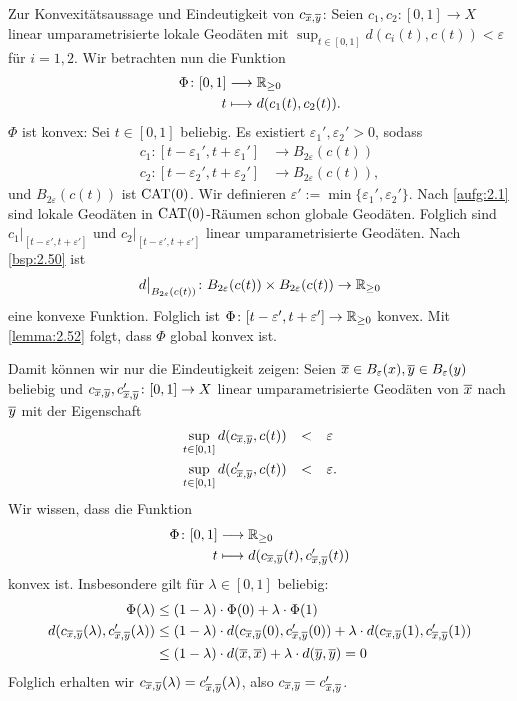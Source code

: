 \begin{beweis}
	Zur Konvexitätsaussage und Eindeutigkeit von $c_{\overline{x},\overline{y}}$:
	Seien $c_1,c_2 \colon [0,1] \rightarrow X$ linear umparametrisierte lokale Geodäten mit $\sup_{t \in [0,1]} d(c_i(t),c(t)) < \varepsilon$ für $i = 1,2$.
	Wir betrachten nun die Funktion
	\begin{align*}
		\Phi\colon [0,1] &\longrightarrow \mathbb{R}_{\geq 0} \\
		t &\longmapsto d(c_1(t),c_2(t)).
	\end{align*}
	$\Phi$ ist konvex:
	Sei $t \in [0,1]$ beliebig.
	Es existiert $\varepsilon_1', \varepsilon_2' > 0$, sodass
	\begin{align*}
		c_1 \colon [t- \varepsilon_1', t+ \varepsilon_1'] &\longrightarrow B_{2\varepsilon}(c(t)) \\
		c_2 \colon [t-\varepsilon_2', t+\varepsilon_2'] &\longrightarrow B_{2\varepsilon}(c(t)),
	\end{align*}
	und $B_{2\varepsilon}(c(t))$ ist $\operatorname{CAT(0)}$.
	Wir definieren $\varepsilon' := \min\{ \varepsilon_1',\varepsilon_2'\}$.
	Nach \autoref{aufg:2.1} sind lokale Geodäten in $\operatorname{CAT(0)}$-Räumen schon globale Geodäten.
	Folglich sind  $c_1 \big|_{[t-\varepsilon',t+\varepsilon']}$ und $c_2 \big|_{[t-\varepsilon',t+\varepsilon']}$ linear umparametrisierte Geodäten.
	Nach \autoref{bsp:2.50} ist
	\[
	d \big|_{B_{2\varepsilon}(c(t))} \colon B_{2\varepsilon}(c(t)) \times B_{2\varepsilon}(c(t)) \rightarrow \mathbb{R}_{\geq 0}
	\]
	eine konvexe Funktion. Folglich ist $\Phi \colon [t- \varepsilon',t+\varepsilon'] \rightarrow \mathbb{R}_{\geq 0}$ konvex.
	Mit \autoref{lemma:2.52} folgt, dass $\Phi$ global konvex ist.
	
	Damit können wir nur die Eindeutigkeit zeigen:
	Seien $\overline{x} \in B_\varepsilon(x), \overline{y} \in B_\varepsilon(y)$ beliebig und $c_{\overline{x},\overline{y}}, c_{\overline{x},\overline{y}}' \colon [0,1] \rightarrow X$ linear umparametrisierte Geodäten von $\overline{x}$ nach $\overline{y}$ mit der Eigenschaft
	\begin{align*}
		\sup_{t\in [0,1]} d(c_{\ol{x},\ol{y}}, c(t)) &\stack{}{<} \varepsilon \\
		\sup_{t \in [0,1]} d(c_{\ol{x},\ol{y}}',c(t)) &\stack{}{<} \varepsilon.
	\end{align*}
	Wir wissen, dass die Funktion
	\begin{align*}
		\Phi\colon [0,1] &\longrightarrow \mathbb{R}_{\geq 0} \\
		t &\longmapsto d(c_{\overline{x},\overline{y}}(t),c_{\overline{x},\overline{y}}'(t))
	\end{align*}
	konvex ist. \newpage
	Insbesondere gilt für $\lambda \in [0,1]$ beliebig:
	\begin{align*}
		\Phi(\lambda) &\leq (1-\lambda) \cdot \Phi(0) + \lambda \cdot \Phi(1) \\
		d(c_{\overline{x},\overline{y}}(\lambda),c_{\overline{x},\overline{y}}'(\lambda)) &\leq (1-\lambda) \cdot d(c_{\overline{x},\overline{y}}(0),c_{\overline{x},\overline{y}}'(0)) + \lambda \cdot d(c_{\overline{x},\overline{y}}(1),c_{\overline{x},\overline{y}}'(1)) \\
		&\leq (1-\lambda) \cdot d(\overline{x},\overline{x}) + \lambda \cdot d(\overline{y},\overline{y}) = 0
	\end{align*}
	Folglich erhalten wir $c_{\overline{x},\overline{y}}(\lambda) = c_{\overline{x},\overline{y}}'(\lambda)$, also $c_{\overline{x},\overline{y}} = c_{\overline{x},\overline{y}}'$.
					

\end{beweis}
